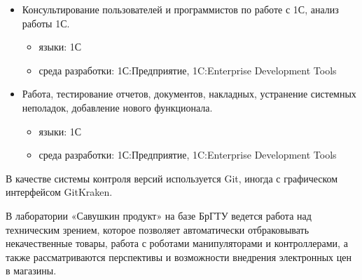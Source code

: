 \begin{itemize}
\begin{itemize}
  \end{itemize}
  \item Консультирование пользователей и программистов по работе с 1С, анализ работы 1С.
  \begin{itemize}
      \item языки: 1С
      \item среда разработки: 1С:Предприятие, 1C:Enterprise Development Tools
  \end{itemize}
  \item Работа, тестирование отчетов, документов, накладных, устранение системных неполадок, добавление нового функционала.
  \begin{itemize}
      \item языки: 1С
      \item среда разработки: 1С:Предприятие, 1C:Enterprise Development Tools
  \end{itemize}
\end{itemize}
В качестве системы контроля версий используется Git, иногда с графическом интерфейсом GitKraken.

В лаборатории «Савушкин продукт» на базе БрГТУ ведется работа над техническим зрением, которое позволяет автоматически отбраковывать некачественные товары, работа с роботами манипуляторами и контроллерами, а также рассматриваются перспективы и возможности внедрения электронных цен в магазины.

